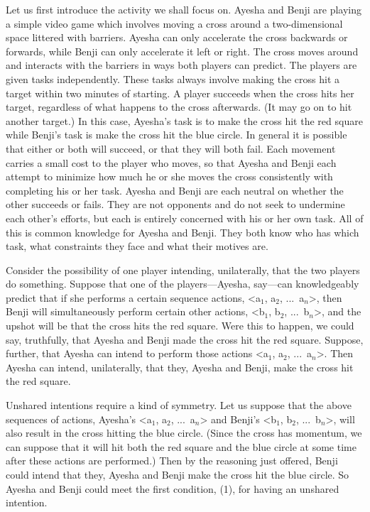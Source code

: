 \documentclass[12pt,\papersize]{extarticle}
\begin{document}
Let us first introduce the activity we shall focus on.
Ayesha and Benji  are playing a simple video game which involves moving a cross around a two-dimensional space littered with barriers.
Ayesha can only accelerate the cross backwards or forwards,
while Benji can only accelerate it left or right. 
The cross moves around and interacts with the barriers in ways both players can predict.
The players are given tasks independently. 
These tasks always involve making the cross hit a target within two minutes of starting. 
A player succeeds when the cross hits her target, regardless of what happens to the cross afterwards.  
(It may go on to hit another target.)
In this case, 
	Ayesha's task is to make the cross hit the red square
	while
	Benji's task is make the cross hit the blue circle. 
In general it is possible that either or both will succeed, or that they will both fail.
Each movement carries a small cost to the player who moves, so that Ayesha and Benji each attempt to minimize how much he or she moves the cross consistently with completing his or her task.
Ayesha and Benji are each neutral on whether the other succeeds or fails.
They are not opponents and do not seek to undermine each other's efforts, but each is entirely concerned  with his or her own task.
All of this is common knowledge for Ayesha and Benji.
They both know who has which task, what constraints they face and what their motives are.

Consider the possibility of one player intending, unilaterally, that the two players do something.
Suppose that one of the players---Ayesha, say---can knowledgeably predict that if she performs a certain sequence actions, <a$_1$, a$_2$, ...\ a$_n$>, then Benji will simultaneously perform certain other actions, <b$_1$, b$_2$, ...\ b$_n$>,
 and the upshot will be that the cross hits the red square.
Were this to happen, we could say, truthfully, that Ayesha and Benji made the cross hit the red square.
Suppose, further, that Ayesha can intend to perform those actions <a$_1$, a$_2$, ...\ a$_n$>.
Then Ayesha can intend, unilaterally, that they, Ayesha and Benji, make the cross hit the red square.

Unshared intentions require a kind of symmetry.
Let us suppose that the above sequences of actions,
	Ayesha's <a$_1$, a$_2$, ...\ a$_n$>  and 
	Benji's <b$_1$, b$_2$, ...\ b$_n$>,
will also result in the cross hitting the blue circle. 
(Since the cross has momentum, we can suppose that it will hit both the red square and the blue circle at some time after these actions are performed.)
Then by the reasoning just offered, Benji could intend that they, Ayesha and Benji make the cross hit the blue circle.
So Ayesha and Benji could meet the first condition, (1), for having an unshared intention.
\end{document}
